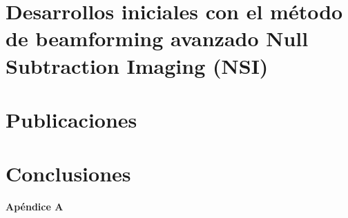 \documentclass[10pt,a4paper]{article}
\begin{document}
\section{Desarrollos iniciales con el método de beamforming avanzado Null Subtraction Imaging (NSI)}\label{sec:nsi}

\section{Publicaciones}\label{sec:publicaciones}

\section{Conclusiones}\label{sec:conclusiones}

\newpage
\appendix

\vspace*{\fill}
\begin{center}
	{\LARGE \textbf{Apéndice A}}
\end{center}
\vspace*{\fill}
\newpage

%
\end{document}
